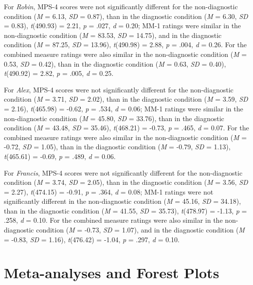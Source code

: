 \documentclass[
  man,floatsintext]{apa6}
\begin{document}
For \emph{Robin}, MPS-4 scores were not significantly different for the non-diagnostic condition (\emph{M} = 6.13, \emph{SD} = 0.87), than in the diagnostic condition (\emph{M} = 6.30, \emph{SD} = 0.83), \emph{t}(490.93) = 2.21, \emph{p} = .027, \emph{d} = 0.20; MM-1 ratings were similar in the non-diagnostic condition (\emph{M} = 83.53, \emph{SD} = 14.75), and in the diagnostic condition (\emph{M} = 87.25, \emph{SD} = 13.96), \emph{t}(490.98) = 2.88, \emph{p} = .004, \emph{d} = 0.26. For the combined measure ratings were also similar in the non-diagnostic condition (\emph{M} = 0.53, \emph{SD} = 0.42), than in the diagnostic condition (\emph{M} = 0.63, \emph{SD} = 0.40), \emph{t}(490.92) = 2.82, \emph{p} = .005, \emph{d} = 0.25.

For \emph{Alex}, MPS-4 scores were not significantly different for the non-diagnostic condition (\emph{M} = 3.71, \emph{SD} = 2.02), than in the diagnostic condition (\emph{M} = 3.59, \emph{SD} = 2.16), \emph{t}(465.98) = -0.62, \emph{p} = .534, \emph{d} = 0.06; MM-1 ratings were similar in the non-diagnostic condition (\emph{M} = 45.80, \emph{SD} = 33.76), than in the diagnostic condition (\emph{M} = 43.48, \emph{SD} = 35.46), \emph{t}(468.21) = -0.73, \emph{p} = .465, \emph{d} = 0.07. For the combined measure ratings were also similar in the non-diagnostic condition (\emph{M} = -0.72, \emph{SD} = 1.05), than in the diagnostic condition (\emph{M} = -0.79, \emph{SD} = 1.13), \emph{t}(465.61) = -0.69, \emph{p} = .489, \emph{d} = 0.06.

For \emph{Francis}, MPS-4 scores were not significantly different for the non-diagnostic condition (\emph{M} = 3.74, \emph{SD} = 2.05), than in the diagnostic condition (\emph{M} = 3.56, \emph{SD} = 2.27), \emph{t}(474.15) = -0.91, \emph{p} = .364, \emph{d} = 0.08; MM-1 ratings were not significantly different in the non-diagnostic condition (\emph{M} = 45.16, \emph{SD} = 34.18), than in the diagnostic condition (\emph{M} = 41.55, \emph{SD} = 35.73), \emph{t}(478.97) = -1.13, \emph{p} = .258, \emph{d} = 0.10. For the combined measure ratings were also similar in the non-diagnostic condition (\emph{M} = -0.73, \emph{SD} = 1.07), and in the diagnostic condition (\emph{M} = -0.83, \emph{SD} = 1.16), \emph{t}(476.42) = -1.04, \emph{p} = .297, \emph{d} = 0.10.

\pagebreak

\section{Meta-analyses and Forest Plots}\label{meta-analyses-and-forest-plots}
\end{document}
